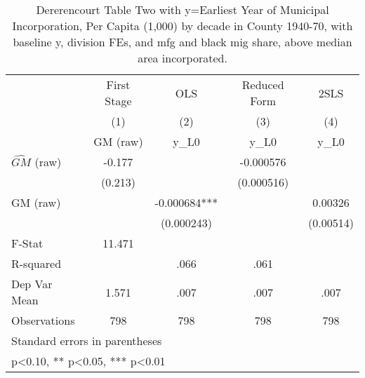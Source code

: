 \begin{table}[htbp]\centering
\def\sym#1{\ifmmode^{#1}\else\(^{#1}\)\fi}
\caption{Dererencourt Table Two with y=Earliest Year of Municipal Incorporation, Per Capita (1,000) by decade in County 1940-70, with baseline y, division FEs, and mfg and black mig share, above median area incorporated.}
\begin{tabular}{l*{4}{c}}
\toprule
                    & First Stage   &         OLS   &Reduced Form   &        2SLS   \\
                    &\multicolumn{1}{c}{(1)}&\multicolumn{1}{c}{(2)}&\multicolumn{1}{c}{(3)}&\multicolumn{1}{c}{(4)}\\
                    &\multicolumn{1}{c}{GM  (raw)}&\multicolumn{1}{c}{y\_L0}&\multicolumn{1}{c}{y\_L0}&\multicolumn{1}{c}{y\_L0}\\
\midrule
$\hat{GM}$ (raw)    &      -0.177   &               &   -0.000576   &               \\
                    &     (0.213)   &               &  (0.000516)   &               \\
\addlinespace
GM  (raw)           &               &   -0.000684***&               &     0.00326   \\
                    &               &  (0.000243)   &               &   (0.00514)   \\
\midrule
F-Stat              &      11.471   &               &               &               \\
R-squared           &               &        .066   &        .061   &               \\
Dep Var Mean        &       1.571   &        .007   &        .007   &        .007   \\
Observations        &         798   &         798   &         798   &         798   \\
\bottomrule
\multicolumn{5}{l}{\footnotesize Standard errors in parentheses}\\
\multicolumn{5}{l}{\footnotesize * p<0.10, ** p<0.05, *** p<0.01}\\
\end{tabular}
\end{table}
